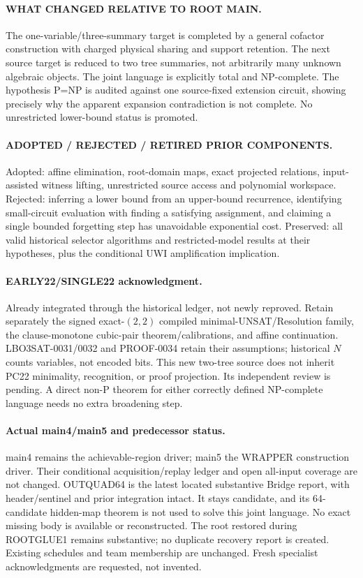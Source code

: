 \documentclass[11pt]{article}
\begin{document}
\paragraph{WHAT CHANGED RELATIVE TO ROOT MAIN.}
The one-variable/three-summary target is completed by a general cofactor
construction with charged physical sharing and support retention. The next
source target is reduced to two tree summaries, not arbitrarily many unknown
algebraic objects. The joint language is explicitly total and NP-complete.
The hypothesis P=NP is audited against one source-fixed extension circuit,
showing precisely why the apparent expansion contradiction is not complete.
No unrestricted lower-bound status is promoted.

\paragraph{ADOPTED / REJECTED / RETIRED PRIOR COMPONENTS.}
Adopted: affine elimination, root-domain maps, exact projected relations,
input-assisted witness lifting, unrestricted source access and polynomial
workspace. Rejected: inferring a lower bound from an upper-bound recurrence,
identifying small-circuit evaluation with finding a satisfying assignment,
and claiming a single bounded forgetting step has unavoidable exponential
cost. Preserved: all valid historical selector algorithms and restricted-model
results at their hypotheses, plus the conditional UWI amplification implication.

\paragraph{EARLY22/SINGLE22 acknowledgment.}
Already integrated through the historical ledger, not newly reproved. Retain
separately the signed exact-$(2,2)$ compiled minimal-UNSAT/Resolution family,
the clause-monotone cubic-pair theorem/calibrations, and affine continuation.
LBO3SAT-0031/0032 and PROOF-0034 retain their assumptions; historical $N$
counts variables, not encoded bits. This new two-tree source does not inherit
PC22 minimality, recognition, or proof projection. Its independent review
is pending. A direct non-P theorem for either correctly defined NP-complete
language needs no extra broadening step.

\paragraph{Actual main4/main5 and predecessor status.}
main4 remains the achievable-region driver; main5 the WRAPPER construction
driver. Their conditional acquisition/replay ledger and open all-input coverage
are not changed. OUTQUAD64 is the latest located substantive Bridge report,
with header/sentinel and prior integration intact. It stays candidate, and
its 64-candidate hidden-map theorem is not used to solve this joint language.
No exact missing body is available or reconstructed. The root restored during
ROOTGLUE1 remains substantive; no duplicate recovery report is created.
Existing schedules and team membership are unchanged. Fresh specialist
acknowledgments are requested, not invented.
\end{document}
